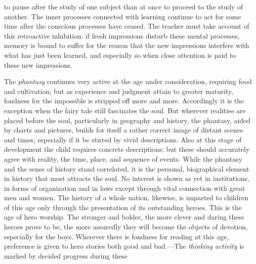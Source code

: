 to pause after the study of one subject than at once to proceed to the study of another. The inner processes connected with learning continue to act for some time after the conscious processes have ceased. The teacher must take account of this retroactive inhibition: if fresh impressions disturb these mental processes, memory is bound to suffer for the reason that the new impressions interfere with what has just been learned, and especially so when close attention is paid to these new impressions.

The \emph{phantasy} continues very active at the age under consideration, requiring food and cultivation; but as experience and judgment attain to greater maturity, fondness for the impossible is stripped off more and more. Accordingly it is the exception when the fairy tale still fascinates the soul. But wherever realities are placed before the soul, particularly in geography and history, the phantasy, aided by charts and pictures, builds for itself a rather correct image of distant scenes and times, especially if it be stirred by vivid descriptions. Also at this stage of development the child requires concrete descriptions; but these should accurately agree with reality, the time, place, and sequence of events. While the phantasy and the sense of history stand correlated, it is the personal, biographical element in history that most attracts the soul. No interest is shown as yet in institutions, in forms of organization and in laws except through vital connection with great men and women. The history of a whole nation, likewise, is imparted to children of this age only through the presentation of its outstanding heroes. This is the age of hero worship. The stronger and bolder, the more clever and daring these heroes prove to be, the more assuredly they will become the objects of devotion, especially for the boys. Wherever there is fondness for reading at this age, preference is given to hero stories both good and bad.—The \emph{thinking activity} is marked by decided progress during these
